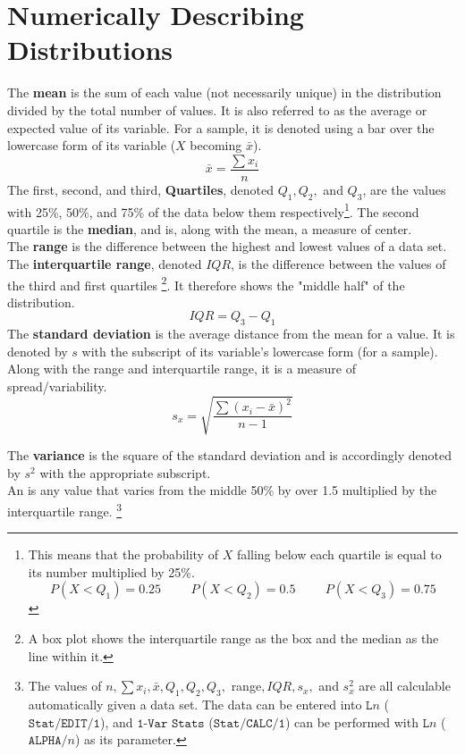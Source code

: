 \documentclass[../AP_Statistics.tex]{subfiles}
\begin{document}
		\section{Numerically Describing Distributions}
			The \textbf{mean} is the sum of each value (not necessarily unique) in the distribution divided by the total number of values. It is also referred to as the average or expected value of its variable. For a sample, it is denoted using a bar over the lowercase form of its variable ($X$ becoming $\bar{x}$).
			$$\bar{x} = \frac{\sum x_i}{n}$$
			The first, second, and third, \textbf{Quartiles}, denoted $Q_1, Q_2,$ and $Q_3$, are the values with 25\%, 50\%, and 75\% of the data below them respectively\footnote{This means that the probability of $X$ falling below each quartile is equal to its number multiplied by 25\%. $$P(X < Q_1) = 0.25 \hspace{1cm} P(X < Q_2) = 0.5 \hspace{1cm} P(X < Q_3) = 0.75$$}. The second quartile is the \textbf{median}, and is, along with the mean, a measure of center. \\
			The \textbf{range} is the difference between the highest and lowest values of a data set. \\
			The \textbf{interquartile range}, denoted $IQR$, is the difference between the values of the third and first quartiles \footnote{A box plot shows the interquartile range as the box and the median as the line within it.}. It therefore shows the "middle half" of the distribution.
			$$IQR = Q_3 - Q_1$$
			The \textbf{standard deviation} is the average distance from the mean for a value. It is denoted by $s$  with the subscript of its variable's lowercase form (for a sample). Along with the range and interquartile range, it is a measure of spread/variability.
			$$s_x = \sqrt{\frac{\sum (x_i - \bar{x})^2}{n - 1}}$$
			\begin{center}
			\end{center}
			The \textbf{variance} is the square of the standard deviation and is accordingly denoted by $s^2$ with the appropriate subscript. \\
			An  is any value that varies from the middle 50\% by over 1.5 multiplied by the interquartile range. \footnote{The values of $n, \sum x_i, \bar{x}, Q_1, Q_2, Q_3, $ range$, IQR, s_x, $ and $s_x^2$ are all calculable automatically given a data set. The data can be entered into $\texttt{L}n$ ($\texttt{Stat/EDIT/1}$), and $\texttt{1-Var Stats}$ ($\texttt{Stat/CALC/1}$) can be performed with $\texttt{L}n$ ($\texttt{ALPHA/}n$) as its parameter.}
\end{document}
